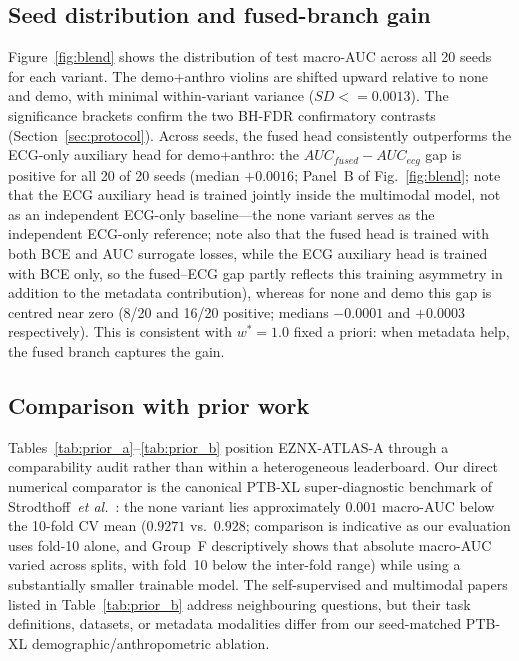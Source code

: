 \documentclass[mathematics,article,submit,pdftex]{Definitions/mdpi}
\def\texttt#1{#1}%
\def\mathrm#1{#1}%
\def\textbf#1{#1}%
\def\leq{<=}%
\begin{document}
\subsection{Seed distribution and fused-branch gain}
Figure~\ref{fig:blend} shows the distribution of test macro-AUC across all 20 seeds for each variant. The \texttt{demo+anthro} violins are shifted upward relative to \texttt{none} and \texttt{demo}, with minimal within-variant variance ($\mathrm{SD}{\leq}0.0013$). The significance brackets confirm the two BH-FDR confirmatory contrasts (Section~\ref{sec:protocol}). Across seeds, the fused head consistently outperforms the ECG-only auxiliary head for \texttt{demo+anthro}: the $\mathrm{AUC}_{\mathrm{fused}} - \mathrm{AUC}_{\mathrm{ecg}}$ gap is positive for \textbf{all 20 of 20 seeds} (median $+0.0016$; Panel~B of Fig.~\ref{fig:blend}; note that the ECG auxiliary head is trained jointly inside the multimodal model, not as an independent ECG-only baseline---the \texttt{none} variant serves as the independent ECG-only reference; note also that the fused head is trained with both BCE and AUC surrogate losses, while the ECG auxiliary head is trained with BCE only, so the fused--ECG gap partly reflects this training asymmetry in addition to the metadata contribution), whereas for \texttt{none} and \texttt{demo} this gap is centred near zero (8/20 and 16/20 positive; medians $-0.0001$ and $+0.0003$ respectively). This is consistent with $w^{\ast}{=}1.0$ fixed a priori: when metadata help, the fused branch captures the gain.

\subsection{Comparison with prior work}
Tables~\ref{tab:prior_a}--\ref{tab:prior_b} position EZNX-ATLAS-A through a comparability audit rather than within a heterogeneous leaderboard. Our direct numerical comparator is the canonical PTB-XL super-diagnostic benchmark of Strodthoff~\textit{et al.}~\cite{Strodthoff2021}: the \texttt{none} variant lies approximately $0.001$ macro-AUC below the 10-fold CV mean ($0.9271$ vs.\ $0.928$; comparison is indicative as our evaluation uses fold-10 alone, and Group~F descriptively shows that absolute macro-AUC varied across splits, with fold~10 below the inter-fold range) while using a substantially smaller trainable model. The self-supervised and multimodal papers listed in Table~\ref{tab:prior_b} address neighbouring questions, but their task definitions, datasets, or metadata modalities differ from our seed-matched PTB-XL demographic/anthropometric ablation.
\end{document}
